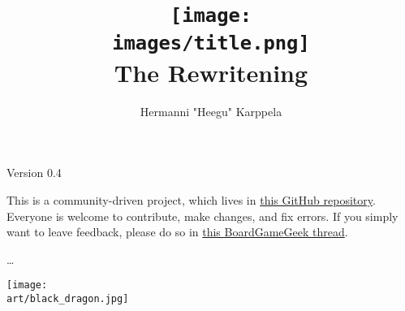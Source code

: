 \documentclass[12pt]{article}
\def\_assets{assets}
\def\art{\_assets/art}
\def\images{\_assets/images}
\begin{document}
\title{\texttt{[image: \\images/title.png]}\\The Rewritening}

\author{Hermanni "Heegu" Karppela}
\maketitle

\begin{center}
Version 0.4
\end{center}

\bigbreak

This is a community-driven project, which lives in \href{https://github.com/Heegu-sama/Homm3BG}{this GitHub repository}.
Everyone is welcome to contribute, make changes, and fix errors.
If you simply want to leave feedback, please do so in \href{https://boardgamegeek.com/thread/3235221/rule-book-rewrite-project}{this BoardGameGeek thread}.

\bigbreak
\ldots

\clearpage

\begin{multicols*}{2}
\tableofcontents
\vspace*{\fill}
\columnbreak
\vspace*{\fill}
\texttt{[image: \\art/black\_dragon.jpg]}
\end{multicols*}

\clearpage


































\end{document}
